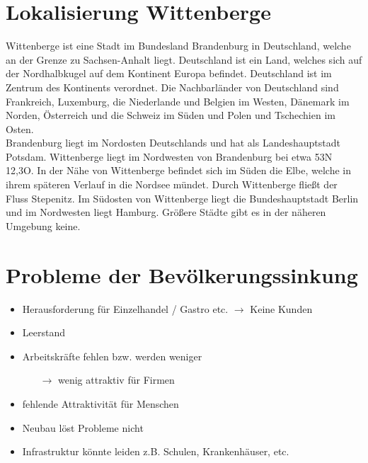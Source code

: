 \documentclass[12pt,a4paper]{report}
\begin{document}
	\section{Lokalisierung Wittenberge}	Wittenberge ist eine Stadt im Bundesland Brandenburg in Deutschland, welche an der Grenze zu Sachsen-Anhalt liegt.
	Deutschland ist ein Land, welches sich auf der Nordhalbkugel auf dem Kontinent Europa befindet.
	Deutschland ist im Zentrum des Kontinents verordnet.
	Die Nachbarländer von Deutschland sind Frankreich, Luxemburg, die Niederlande und Belgien im Westen, Dänemark im Norden, Österreich und die Schweiz im Süden und Polen und Tschechien im Osten.
	\\
	Brandenburg liegt im Nordosten Deutschlands und hat als Landeshauptstadt Potsdam.
	Wittenberge liegt im Nordwesten von Brandenburg bei etwa 53\degree N 12,3\degree O.
	In der Nähe von Wittenberge befindet sich im Süden die Elbe, welche in ihrem späteren Verlauf in die Nordsee mündet.
	Durch Wittenberge fließt der Fluss Stepenitz.
	Im Südosten von Wittenberge liegt die Bundeshauptstadt Berlin und im Nordwesten liegt Hamburg.
	Größere Städte gibt es in der näheren Umgebung keine.
	\section{Probleme der Bevölkerungssinkung}
	\begin{itemize}
		\item Herausforderung für Einzelhandel / Gastro etc. $\to$ Keine Kunden
		\item Leerstand
		\item Arbeitskräfte fehlen bzw. werden weniger
		\begin{itemize}
			\item[$\to$] wenig attraktiv für Firmen
		\end{itemize}
		\item fehlende Attraktivität für Menschen
		\item Neubau löst Probleme nicht
		\item Infrastruktur könnte leiden z.B. Schulen, Krankenhäuser, etc.
	\end{itemize}
\end{document}
